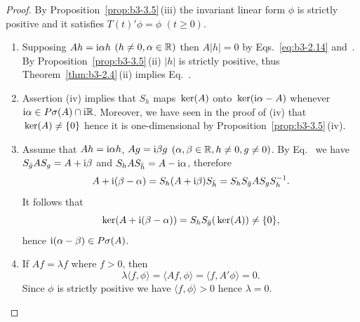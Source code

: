 \begin{proof}
	By Proposition~\ref{prop:b3-3.5}\,(iii) the invariant linear form $\phi$ is strictly positive and it satisfies $T(t)'\phi = \phi$ $(t \geq 0)$.
	\begin{enumerate}[wide, labelindent=.25em]
	\item[(iv)] 
	Supposing $Ah = \mathrm{i}\alpha h$ $(h \neq 0, \alpha \in \mathbb{R})$ then $A|h| = 0$ by Eqs.~\eqref{eq:b3-2.14} and~.
	By Proposition~\ref{prop:b3-3.5}\,(ii) $|h|$ is strictly positive, thus Theorem~\ref{thm:b3-2.4}\,(ii) implies Eq.~.
	
	\item[(ii)] 
	Assertion (iv) implies that $S_{h}$ maps $\mathop{}\mathrm{ker}(A)$ onto $\mathop{}\mathrm{ker}(\mathrm{i}\alpha - A)$ whenever $\mathrm{i} \alpha \in P\sigma(A)\cap \mathrm{i}\mathbb{R}$.
	Moreover, we have seen in the proof of (iv) that $\mathop{}\mathrm{ker}(A) \neq \{0\}$ hence it is one-dimensional by Proposition~\ref{prop:b3-3.5}\,(iv).
	
	\item[(i)] 
	Assume that $Ah = \mathrm{i}\alpha h$, $Ag = \mathrm{i}\beta g$ $(\alpha,\beta \in \mathbb{R}, h \neq 0, g \neq 0)$.
	By Eq.~ we have $S_{\bar{g}}A S_{g} = A + \mathrm{i}\beta$ and $S_{h}A S_{\bar{h}} = A - \mathrm{i}\alpha$, therefore
	\begin{equation}\label{eq:b3-3.6}
	A + \mathrm{i}(\beta - \alpha) = S_{h}(A + \mathrm{i}\beta)S_{\bar{h}} = S_{h}S_{\bar{g}}A S_{g}S_{h}^{-1}.
	\end{equation}
	It follows that 
    \[%
    \Kern{A + \im(\beta - \alpha)} = S_{h}S_{\bar{g}}(\Kern{A}) \neq \{0\} , 
    \]
    hence $\mathrm{i} (\alpha - \beta) \in P\sigma(A)$.
	
	\item[(v)] 
	If\/ $Af = \lambda f$ where $f > 0$, then
	\begin{equation}\label{eq:b3-3.7}
	\lambda\langle f,\phi\rangle = \langle Af,\phi\rangle = \langle f,A'\phi\rangle = 0.
	\end{equation}
	Since $\phi$ is strictly positive we have $\langle f,\phi\rangle > 0$ hence $\lambda = 0$.
	

\end{enumerate}
\end{proof}
